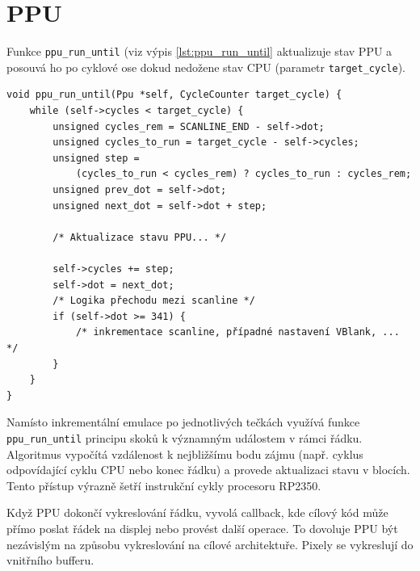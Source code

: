 \section{PPU}


Funkce \texttt{ppu\_run\_until} (viz výpis \ref{lst:ppu_run_until} aktualizuje stav PPU a posouvá ho
po cyklové ose dokud nedožene stav CPU (parametr \texttt{target\_cycle}).

\begin{listing}[htbp]
\begin{verbatim}
void ppu_run_until(Ppu *self, CycleCounter target_cycle) {
    while (self->cycles < target_cycle) {
        unsigned cycles_rem = SCANLINE_END - self->dot;
        unsigned cycles_to_run = target_cycle - self->cycles;
        unsigned step =
            (cycles_to_run < cycles_rem) ? cycles_to_run : cycles_rem;
        unsigned prev_dot = self->dot;
        unsigned next_dot = self->dot + step;

        /* Aktualizace stavu PPU... */

        self->cycles += step;
        self->dot = next_dot;
        /* Logika přechodu mezi scanline */
        if (self->dot >= 341) {
            /* inkrementace scanline, případné nastavení VBlank, ... */
        }
    }
}
\end{verbatim}
\caption{Funkce pro aktualizaci stavu PPU, implementovaná pomocí catch-up mechanismu.}
\label{lst:ppu_run_until}
\end{listing}

Namísto inkrementální emulace po jednotlivých tečkách využívá funkce \texttt{ppu\_run\_until}
principu skoků k významným událostem v rámci řádku. Algoritmus vypočítá vzdálenost k nejbližšímu
bodu zájmu (např. cyklus odpovídající cyklu CPU nebo konec řádku) a provede aktualizaci stavu v
blocích. Tento přístup výrazně šetří instrukční cykly procesoru RP2350.

\label{ppu_scanline_callback}
Když PPU dokončí vykreslování řádku, vyvolá callback, kde cílový kód může přímo poslat řádek na
displej nebo provést další operace. To dovoluje PPU být nezávislým na způsobu vykreslování na cílové
architektuře. Pixely se vykreslují do vnitřního bufferu.

